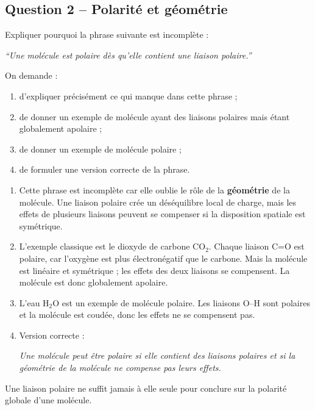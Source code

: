 \documentclass[11pt,a4paper]{article}
\begin{document}
\subsection{Question 2 -- Polarité et géométrie}

\begin{enoncebox}
Expliquer pourquoi la phrase suivante est incomplète :

\begin{center}
\textit{``Une molécule est polaire dès qu'elle contient une liaison polaire.''}
\end{center}

On demande :
\begin{enumerate}[label=\arabic*)]
    \item d'expliquer précisément ce qui manque dans cette phrase ;
    \item de donner un exemple de molécule ayant des liaisons polaires mais étant globalement apolaire ;
    \item de donner un exemple de molécule polaire ;
    \item de formuler une version correcte de la phrase.
\end{enumerate}
\end{enoncebox}

\begin{corrigebox}
\begin{enumerate}[label=\arabic*)]
    \item Cette phrase est incomplète car elle oublie le rôle de la \textbf{géométrie} de la molécule.  
    Une liaison polaire crée un déséquilibre local de charge, mais les effets de plusieurs liaisons peuvent se compenser si la disposition spatiale est symétrique.
    
    \item L'exemple classique est le dioxyde de carbone \(\mathrm{CO_2}\).  
    Chaque liaison C=O est polaire, car l'oxygène est plus électronégatif que le carbone.  
    Mais la molécule est linéaire et symétrique ; les effets des deux liaisons se compensent.  
    La molécule est donc globalement apolaire.
    
    \item L'eau \(\mathrm{H_2O}\) est un exemple de molécule polaire.  
    Les liaisons O--H sont polaires et la molécule est coudée, donc les effets ne se compensent pas.
    
    \item Version correcte :
    
    \begin{center}
    \textit{Une molécule peut être polaire si elle contient des liaisons polaires et si la géométrie de la molécule ne compense pas leurs effets.}
    \end{center}
\end{enumerate}

\begin{attentionbox}
Une liaison polaire ne suffit jamais à elle seule pour conclure sur la polarité globale d'une molécule.
\end{attentionbox}
\end{corrigebox}
\end{document}
